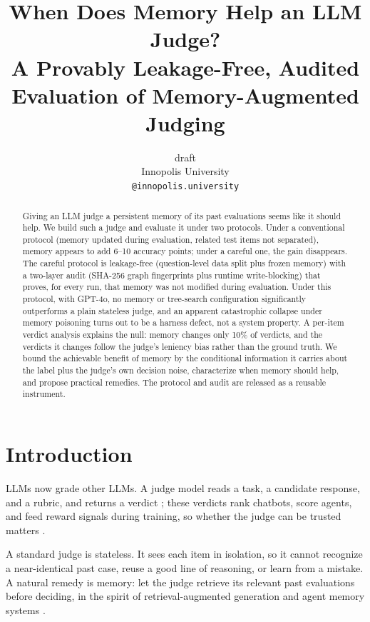 \documentclass[11pt]{article}
\title{When Does Memory Help an LLM Judge? \\ A Provably Leakage-Free, Audited Evaluation of Memory-Augmented Judging}
\author{draft \\
  Innopolis University \\
  \texttt{@innopolis.university} }
\begin{document}
\maketitle

\begin{abstract}
Giving an LLM judge a persistent memory of its past evaluations seems like it should help. We build such a judge and evaluate it under two protocols. Under a conventional protocol (memory updated during evaluation, related test items not separated), memory appears to add 6--10 accuracy points; under a careful one, the gain disappears. The careful protocol is leakage-free (question-level data split plus frozen memory) with a two-layer audit (SHA-256 graph fingerprints plus runtime write-blocking) that proves, for every run, that memory was not modified during evaluation. Under this protocol, with GPT-4o, no memory or tree-search configuration significantly outperforms a plain stateless judge, and an apparent catastrophic collapse under memory poisoning turns out to be a harness defect, not a system property. A per-item verdict analysis explains the null: memory changes only 10\% of verdicts, and the verdicts it changes follow the judge's leniency bias rather than the ground truth. We bound the achievable benefit of memory by the conditional information it carries about the label plus the judge's own decision noise, characterize when memory should help, and propose practical remedies. The protocol and audit are released as a reusable instrument.
\end{abstract}

\section{Introduction}

LLMs now grade other LLMs. A judge model reads a task, a candidate response, and a rubric, and returns a verdict \citep{mt_bench2023, geval2023, judge_survey2024}; these verdicts rank chatbots, score agents, and feed reward signals during training, so whether the judge can be trusted matters \citep{chateval2023, llm_judge_agreement2024}.

A standard judge is stateless. It sees each item in isolation, so it cannot recognize a near-identical past case, reuse a good line of reasoning, or learn from a mistake. A natural remedy is memory: let the judge retrieve its relevant past evaluations before deciding, in the spirit of retrieval-augmented generation \citep{rag_original2020} and agent memory systems \citep{memgpt2023, generative_agents2023, reflexion2023}.
\end{document}
